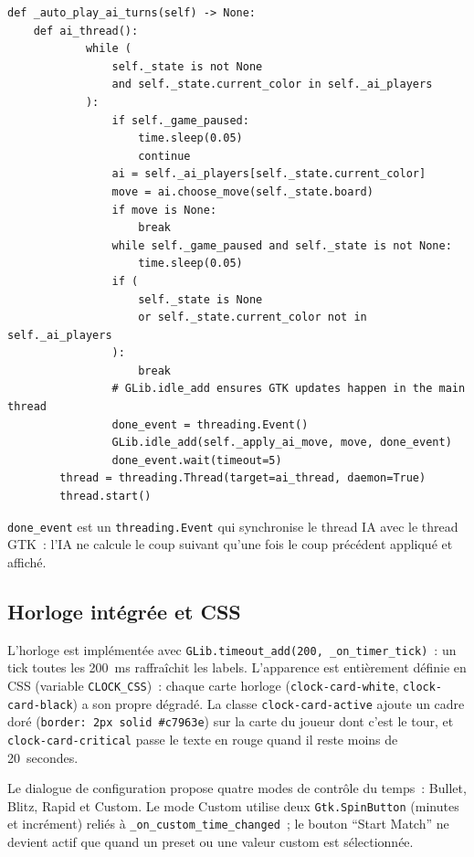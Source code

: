 \documentclass[a4paper,11pt]{article}
\begin{document}
\begin{verbatim}
def _auto_play_ai_turns(self) -> None:
    def ai_thread():
            while (
                self._state is not None
                and self._state.current_color in self._ai_players
            ):
                if self._game_paused:
                    time.sleep(0.05)
                    continue
                ai = self._ai_players[self._state.current_color]
                move = ai.choose_move(self._state.board)
                if move is None:
                    break
                while self._game_paused and self._state is not None:
                    time.sleep(0.05)
                if (
                    self._state is None
                    or self._state.current_color not in self._ai_players
                ):
                    break
                # GLib.idle_add ensures GTK updates happen in the main thread
                done_event = threading.Event()
                GLib.idle_add(self._apply_ai_move, move, done_event)
                done_event.wait(timeout=5)
        thread = threading.Thread(target=ai_thread, daemon=True)
        thread.start()
\end{verbatim}

\texttt{done\_event} est un \texttt{threading.Event} qui synchronise le thread
IA avec le thread GTK~: l'IA ne calcule le coup suivant qu'une fois le coup
précédent appliqué et affiché.

\subsection{Horloge intégrée et CSS}

L'horloge est implémentée avec \texttt{GLib.timeout\_add(200, \_on\_timer\_tick)}~:
un tick toutes les 200~ms raffraîchit les labels. L'apparence est entièrement
définie en CSS (variable \texttt{CLOCK\_CSS})~: chaque carte horloge
(\texttt{clock-card-white}, \texttt{clock-card-black}) a son propre
dégradé. La classe \texttt{clock-card-active} ajoute un cadre doré
(\texttt{border: 2px solid \#c7963e}) sur la carte du joueur dont c'est le
tour, et
\texttt{clock-card-critical} passe le texte en rouge quand
il reste moins de 20~secondes.

Le dialogue de configuration propose quatre modes de contrôle du temps~:
Bullet, Blitz, Rapid et Custom. Le mode Custom utilise deux
\texttt{Gtk.SpinButton} (minutes et incrément) reliés à
\texttt{\_on\_custom\_time\_changed}~; le bouton ``Start Match'' ne devient
actif que quand un preset ou une valeur custom est sélectionnée.
\end{document}
